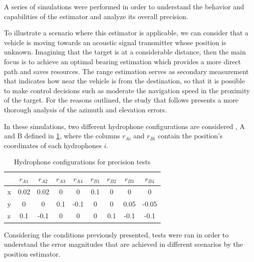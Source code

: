 A series of simulations were performed in order to understand the behavior and capabilities of the estimator and analyze its overall precision.

To illustrate a scenario where this estimator is applicable, we can consider that a vehicle is moving towards an acoustic signal transmitter whose position is unknown. Imagining that the target is at a considerable distance, then the main focus is to achieve an optimal bearing estimation which provides a more direct path and saves resources. The range estimation serves as secondary measurement that indicates how near the vehicle is from the destination, so that it is possible to make control decisions such as moderate the navigation speed in the proximity of the target. For the reasons outlined, the study that follows presents a more thorough analysis of the azimuth and elevation errors. 

In these simulations, two different hydrophone configurations are considered , A and B defined in \ref{tab:configs_test1}, where the columns $r_{Ai}$ and $r_{Bi}$ contain the position's coordinates of each hydrophones $i$.

\begin{table}[!htbp] %
	\begin{center}
		\begin{tabular}{ l | c c c c | c c c c }
	    	\toprule
			\multicolumn{1}{c|}{} & $r_{A1}$ & $r_{A2}$ & $r_{A3}$ & $r_{A4}$ & $r_{B1}$ & $r_{B2}$ & $r_{B3}$ & $r_{B4}$ \\
			\midrule
			\multirow{1}{0.5em}{x} 
			& 0.02 & 0.02 & 0 & 0 & 0.1 & 0 & 0 & 0 \\
			\multirow{1}{0.5em}{y} 
			& 0 & 0 & 0.1 & -0.1 & 0 & 0 & 0.05 & -0.05\\
			\multirow{1}{0.5em}{z} 
			& 0.1 & -0.1  & 0 & 0 & 0 & 0.1 & -0.1 & -0.1\\
			\bottomrule 
		\end{tabular}
		\caption{Hydrophone configurations for precision tests}
		\label{tab:configs_test1}
	\end{center}
\end{table}

Considering the conditions previously presented, tests were ran in order to understand the error magnitudes that are achieved in different scenarios by the position estimator.

